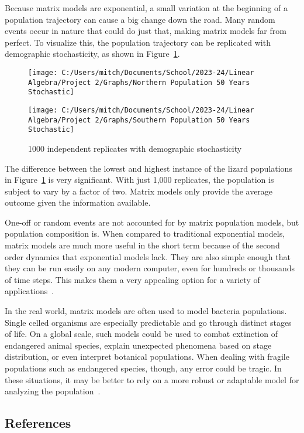 \documentclass{article}
\begin{document}
    Because matrix models are exponential, a small variation at the beginning of a population trajectory can cause a big change down the road.
    Many random events occur in nature that could do just that, making matrix models far from perfect.
    To visualize this, the population trajectory can be replicated with demographic stochasticity, as shown in Figure~\ref{fig:dem_stoch}.

    \begin{figure} [!h]
        \begin{minipage}{0.5\linewidth}
            \centering
            \texttt{[image: C:/Users/mitch/Documents/School/2023-24/Linear Algebra/Project 2/Graphs/Northern Population 50 Years Stochastic]}
        \end{minipage}\hfill
        \begin{minipage}{0.5\linewidth}
            \centering
            \texttt{[image: C:/Users/mitch/Documents/School/2023-24/Linear Algebra/Project 2/Graphs/Southern Population 50 Years Stochastic]}
        \end{minipage}
        \caption{1000 independent replicates with demographic stochasticity}
        \label{fig:dem_stoch}
    \end{figure}

    The difference between the lowest and highest instance of the lizard populations in Figure~\ref{fig:dem_stoch} is very significant.
    With just 1,000 replicates, the population is subject to vary by a factor of two.
    Matrix models only provide the average outcome given the information available.

    One-off or random events are not accounted for by matrix population models, but population composition is.
    When compared to traditional exponential models, matrix models are much more useful in the short term because of the second order dynamics that exponential models lack.
    They are also simple enough that they can be run easily on any modern computer, even for hundreds or thousands of time steps.
    This makes them a very appealing option for a variety of applications~\cite{shoemaker_lab_2024}.

    In the real world, matrix models are often used to model bacteria populations.
    Single celled organisms are especially predictable and go through distinct stages of life.
    On a global scale, such models could be used to combat extinction of endangered animal species, explain unexpected phenomena based on stage distribution, or even interpret botanical populations.
    When dealing with fragile populations such as endangered species, though, any error could be tragic.
    In these situations, it may be better to rely on a more robust or adaptable model for analyzing the population~\cite{hendricks_55_2021}.

    \newpage
    \begin{center}
        \section{References}\label{sec:references}
    \end{center}

    \printbibliography[heading=none]
\end{document}
